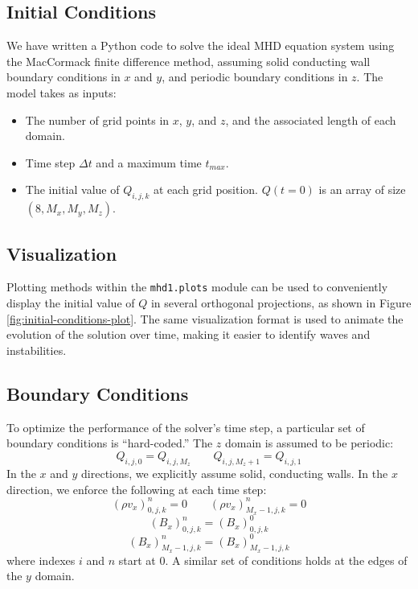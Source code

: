 \documentclass[%
 reprint,
 amsmath,amssymb,
 aps,
]{revtex4-2}
\begin{document}
\subsection{Initial Conditions}
We have written a Python code to solve the ideal MHD equation system using the MacCormack finite difference method, assuming solid conducting wall boundary conditions in $x$ and $y$, and periodic boundary conditions in $z$. The model takes as inputs:
\begin{itemize}
    \item The number of grid points in $x$, $y$, and $z$, and the associated length of each domain.
    \item Time step $\Delta t$ and a maximum time $t_{max}$.
    \item The initial value of $Q_{i,j,k}$ at each grid position. $Q(t=0)$ is an array of size $(8, M_x, M_y, M_z)$.
\end{itemize}
\subsection{Visualization}
Plotting methods within the \texttt{mhd1.plots} module can be used to conveniently display the initial value of $Q$ in several orthogonal projections, as shown in Figure \ref{fig:initial-conditions-plot}. The same visualization format is used to animate the evolution of the solution over time, making it easier to identify waves and instabilities.
\subsection{Boundary Conditions}
To optimize the performance of the solver's time step, a particular set of boundary conditions is ``hard-coded.'' The $z$ domain is assumed to be periodic:
\begin{equation}
Q_{i, j, 0} = Q_{i, j, M_z} \qquad Q_{i, j, M_z + 1} = Q_{i, j, 1}
\end{equation}
In the $x$ and $y$ directions, we explicitly assume solid, conducting walls. In the $x$ direction, we enforce the following at each time step:
\begin{equation}
(\rho v_x) _{0, j, k} ^n = 0 \qquad (\rho v_x) _{M_x-1, j, k} ^n = 0
\end{equation}
\begin{equation}
(B_x) _{0, j, k} ^n = (B_x) _{0, j, k} ^{0}
\end{equation}
\begin{equation}
(B_x)_{M_x-1, j, k} ^n = (B_x) _{M_x-1, j, k} ^{0}
\end{equation}
where indexes $i$ and $n$ start at 0. A similar set of conditions holds at the edges of the $y$ domain.
\end{document}
